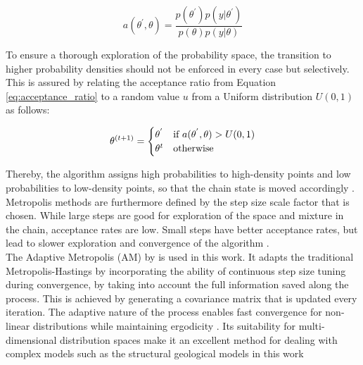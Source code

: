         \begin{equation}\label{eq:acceptance_ratio}
        a(\theta^{'},\theta)=\frac{p(\theta^{'})p(y|\theta^{'})}{p(\theta)p(y|\theta)}
        \end{equation}
        
        To ensure a thorough exploration of the probability space, the transition to higher probability densities should not be enforced in every case but selectively. This is assured by relating the acceptance ratio from Equation \ref{eq:acceptance_ratio} to a random value $u$ from a Uniform distribution $U(0,1)$ as follows:
        
        \begin{equation}\label{eq:transition_selectivity}
        \theta^{(t+1)}=\begin{cases}
        \theta^{'} & $if $ a(\theta^{'},\theta)>U(0,1)\\
        \theta^{t} & $otherwise$\\
        \end{cases}
        \end{equation}
        
        Thereby, the algorithm assigns high probabilities to high-density points and low probabilities to low-density points, so that the chain state is moved accordingly \citep{delaVarga2016}.\\
        Metropolis methods are furthermore defined by the step size scale factor that is chosen. While large steps are good for exploration of the space and mixture in the chain, acceptance rates are low. Small steps have better acceptance rates, but lead to slower exploration and convergence of the algorithm \citep{delaVarga2016}.\\
        The Adaptive Metropolis (AM) by \citet{haario2001adaptive} is used in this work. It adapts the traditional Metropolis-Hastings by incorporating the ability of continuous step size tuning during convergence, by taking into account the full information saved along the process. This is achieved by generating a covariance matrix that is updated every iteration. The adaptive nature of the process enables fast convergence for non-linear distributions while maintaining ergodicity \citet{haario2001adaptive, delaVarga2016}. Its suitability for multi-dimensional distribution spaces make it an excellent method for dealing with complex models such as the structural geological models in this work \citep{schaaf2017}     
        
